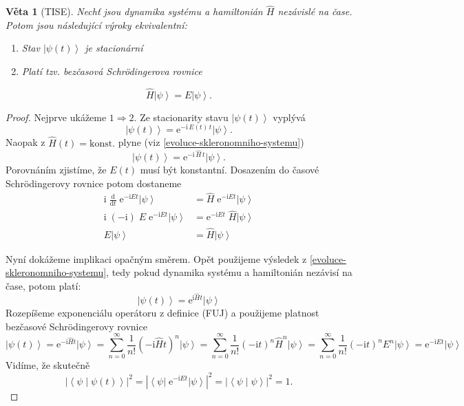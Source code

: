 \documentclass[10pt,a4paper]{report}
\newtheorem{theorem}{Věta}[section]
\theoremstyle{definition}
\newcommand{\const}[1]{\mathrm{#1}}
\newcommand{\abs}[1]{\left| #1 \right|}
\newcommand{\dd}[2]{\frac{\const{d} #1}{\const{d} #2} \;}
\newcommand{\bra}[1]{\left< #1 \right|}
\newcommand{\ket}[1]{\left| #1 \right>}
\newcommand{\braket}[2]{\left< #1 \middle| #2 \right>}
\newcommand{\e}[1]{\const{e}^{#1}}
\newcommand{\I}{\const{i}}
\def\konst{\mathrm{konst.}}
\begin{document}
\begin{theorem}[TISE]
    Nechť jsou dynamika systému a hamiltonián $\hat H$ nezávislé na čase. Potom jsou následující výroky ekvivalentní:
    \begin{enumerate}
        \item Stav $\ket{\psi(t)}$ je stacionární
        \item Platí tzv. bezčasová Schrödingerova rovnice
    \end{enumerate}
    \begin{equation*}
        \hat{H} \ket{\psi} = E \ket{\psi}.
    \end{equation*}
\end{theorem}
\begin{proof}
    Nejprve ukážeme $1 \Rightarrow 2$. Ze stacionarity stavu $\ket{\psi(t)}$ vyplývá
    \begin{equation*}
        \ket{\psi(t)} = \e{-\I \, E(t) \, t} \ket{\psi}.
    \end{equation*}
    Naopak z $\hat H(t) = \konst$ plyne (viz \ref{evoluce-skleronomniho-systemu})
    \begin{equation*}
        \ket{\psi(t)} = \e{-\I \, \hat H \, t} \ket{\psi}.
    \end{equation*}
    Porovnáním zjistíme, že $E(t)$ musí být konstantní. Dosazením do časové Schrödingerovy rovnice potom dostaneme
    \begin{align*}
        \I \; \dd{}{t} \! \e{-\I E t} \ket{\psi}
        &= \hat H \; \e{-\I E t} \ket{\psi}
        \\
        \I \; (-\I) \; E \; \e{-\I E t} \ket{\psi}
        &= \e{-\I E t} \; \hat H \ket{\psi}
        \\
        E \ket{\psi}
        &= \hat H \ket{\psi}
    \end{align*}

    Nyní dokážeme implikaci opačným směrem. Opět použijeme výsledek z \ref{evoluce-skleronomniho-systemu}, tedy pokud dynamika systému a hamiltonián nezávisí na čase, potom platí:
    \begin{equation*}
        \ket{\psi(t)} = \e{\I \hat H t} \ket{\psi}
    \end{equation*}
    Rozepíšeme exponenciálu operátoru z definice (FUJ) a použijeme platnost bezčasové Schrödingerovy rovnice
    \begin{equation*}
        \ket{\psi(t)}
        = \e{-\I \hat H t} \ket{\psi}
        = \sum_{n = 0}^\infty \frac{1}{n!} (-\I \hat H t)^n \ket{\psi}
        = \sum_{n = 0}^\infty \frac{1}{n!} (-\I t)^n \hat H^n \ket{\psi}
        = \sum_{n = 0}^\infty \frac{1}{n!}(-\I t)^n E^n \ket{\psi}
        = \e{-\I E t} \ket{\psi}
    \end{equation*}
    Vidíme, že skutečně
    \begin{equation*}
        \abs{\braket{\psi}{\psi(t)}}^2
        = \abs{\bra{\psi} \; \e{-\I E t} \ket{\psi}}^2
        = \abs{\braket{\psi}{\psi}}^2
        = 1.
    \end{equation*}
\end{proof}
\end{document}
